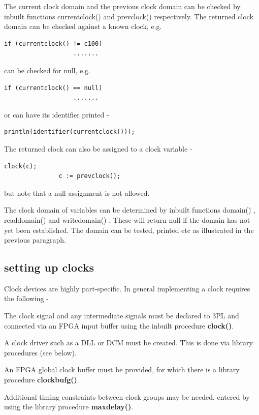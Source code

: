             The current clock domain and the previous clock domain can be
            checked by inbuilt functions currentclock() 
            and prevclock()  respectively. The returned
            clock domain can be checked against a known clock, e.g.
            \begin{lstlisting}[gobble=12, language=threepl]
               if (currentclock() != c100)
                   .......
            \end{lstlisting}
            can be checked for null, e.g.
            \begin{lstlisting}[gobble=12, language=threepl]
               if (currentclock() == null)
                   .......
            \end{lstlisting}
            or can have its identifier printed -
            \begin{lstlisting}[gobble=12, language=threepl]
               println(identifier(currentclock()));
            \end{lstlisting}
            The returned clock can also be assigned to a clock variable -
            \begin{lstlisting}[gobble=12, language=threepl]
               clock(c);
               c := prevclock();
            \end{lstlisting}
            but note that a null assignment is not allowed.
            
            The clock domain of variables can be determined by inbuilt
            functions domain() , readdomain() 
            and writedomain() . These will return null if
            the domain has not yet been established. The domain can be
            tested, printed etc as illustrated in the previous paragraph.

        \subsection{setting up clocks}

            Clock devices are highly part-specific. In general implementing a
            clock requires the following -
            \blist
            \item   The clock signal and any intermediate signals must be
                    declared to 3PL and connected via an FPGA input buffer
                    using the inbuilt procedure {\bf clock()}.
            \item   A clock driver such as a DLL or DCM must be created. This
                    is done via library procedures (see below).
            \item   An FPGA global clock buffer must be provided, for which
                    there is a library procedure {\bf clockbufg()}.
            \item   Additional timing constraints between clock groups may be
                    needed, entered by using the library procedure {\bf
                    maxdelay()}.
            \blend

